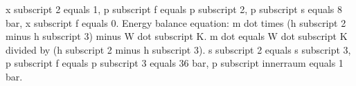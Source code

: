 x subscript 2 equals 1, p subscript f equals p subscript 2, p subscript s equals 8 bar, x subscript f equals 0.
Energy balance equation: m dot times (h subscript 2 minus h subscript 3) minus W dot subscript K.
m dot equals W dot subscript K divided by (h subscript 2 minus h subscript 3).
s subscript 2 equals s subscript 3, p subscript f equals p subscript 3 equals 36 bar, p subscript innerraum equals 1 bar.